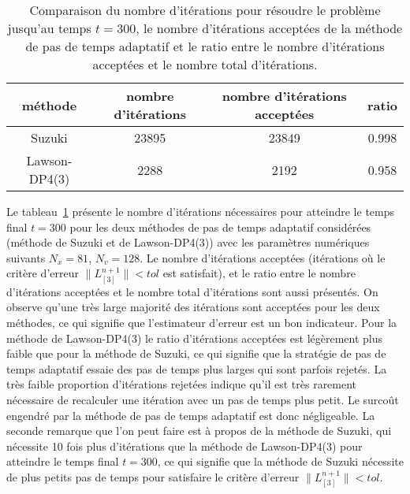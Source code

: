 \begin{table}[h]
	\centering
	\begin{tabular}{c|c|c|c}
      méthode             & nombre d'itérations & nombre d'itérations acceptées & ratio \\
      \hline
      Suzuki              & 23895                & 23849                        & 0.998 \\
      Lawson-DP4(3)       & 2288                 & 2192                         & 0.958 \\
	\end{tabular}
	\caption{Comparaison du nombre d'itérations pour résoudre le problème jusqu'au temps $t=300$, le nombre d'itérations acceptées de la méthode de pas de temps adaptatif et le ratio entre le nombre d'itérations acceptées et le nombre total d'itérations.}
	\label{tab:compare:iteration}
\end{table}

Le tableau~\ref{tab:compare:iteration} présente le nombre d'itérations nécessaires pour atteindre le temps final $t=300$ pour les deux méthodes de pas de temps adaptatif considérées (méthode de Suzuki et de Lawson-DP4(3)) avec les paramètres numériques suivants $N_x=81$, $N_v=128$. Le nombre d'itérations acceptées (itérations où le critère d'erreur $\|L_{[3]}^{n+1}\|<tol$ est satisfait), et le ratio entre le nombre d'itérations acceptées et le nombre total d'itérations sont aussi présentés. On observe qu'une très large majorité des itérations sont acceptées pour les deux méthodes, ce qui signifie que l'estimateur d'erreur est un bon indicateur. Pour la méthode de Lawson-DP4(3) le ratio d'itérations acceptées est légèrement plus faible que pour la méthode de Suzuki, ce qui signifie que la stratégie de pas de temps adaptatif essaie des pas de temps plus larges qui sont parfois rejetés. La très faible proportion d'itérations rejetées indique qu'il est très rarement nécessaire de recalculer une itération avec un pas de temps plus petit. Le surcoût engendré par la méthode de pas de temps adaptatif est donc négligeable. La seconde remarque que l'on peut faire est à propos de la méthode de Suzuki, qui nécessite 10 fois plus d'itérations que la méthode de Lawson-DP4(3) pour atteindre le temps final $t=300$, ce qui signifie que la méthode de Suzuki nécessite de plus petits pas de temps pour satisfaire le critère d'erreur $\|L_{[3]}^{n+1}\|<tol$.

